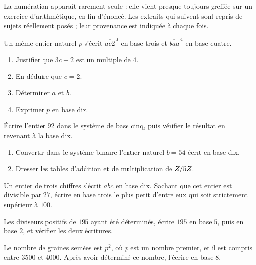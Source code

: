 \begin{annales}
La numération apparaît rarement seule : elle vient presque toujours greffée
sur un exercice d'arithmétique, en fin d'énoncé. Les extraits qui suivent sont
repris de sujets réellement posés ; leur provenance est indiquée à chaque
fois.

Un même entier naturel $p$ s'écrit $\overline{ac2}^{\,3}$ en base trois et
$\overline{baa}^{\,4}$ en base quatre.
\begin{enumerate}[label=\textbf{\alph*)}, leftmargin=*, itemsep=0.15em]
  \item Justifier que $3c+2$ est un multiple de $4$.
  \item En déduire que $c = 2$.
  \item Déterminer $a$ et $b$.
  \item Exprimer $p$ en base dix.
\end{enumerate}

Écrire l'entier $92$ dans le système de base cinq, puis vérifier le résultat
en revenant à la base dix.

\begin{enumerate}[label=\textbf{\alph*)}, leftmargin=*, itemsep=0.15em]
  \item Convertir dans le système binaire l'entier naturel $b = 54$ écrit en
        base dix.
  \item Dresser les tables d'addition et de multiplication de $Z/5Z$.
\end{enumerate}

Un entier de trois chiffres s'écrit $\overline{abc}$ en base dix. Sachant que
cet entier est divisible par $27$, écrire en base trois le plus petit d'entre
eux qui soit strictement supérieur à $100$.

Les diviseurs positifs de $195$ ayant été déterminés, écrire $195$ en base
$5$, puis en base $2$, et vérifier les deux écritures.

Le nombre de graines semées est $p^{2}$, où $p$ est un nombre premier, et il
est compris entre $3500$ et $4000$. Après avoir déterminé ce nombre, l'écrire
en base $8$.
\end{annales}

